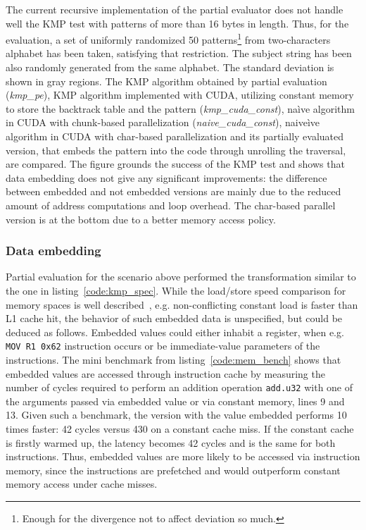 The current recursive implementation of the partial evaluator does not
handle well the KMP test with patterns of more than 16 bytes in length.
Thus, for the evaluation, a set of uniformly randomized 50 patterns\footnote{Enough for the divergence not to affect deviation so much.}
from two-characters alphabet has been taken, satisfying that restriction. The subject string has been also randomly generated from the same alphabet. The standard deviation is shown in gray regions.
The KMP algorithm obtained by partial evaluation (\emph{kmp\_pe}), KMP algorithm implemented with CUDA, utilizing constant memory to store the backtrack table and the pattern (\emph{kmp\_cuda\_const}),
na\`ive algorithm in CUDA with chunk-based parallelization (\emph{naive\_cuda\_const}), naive\`ive algorithm in CUDA with char-based parallelization and its partially evaluated version, that embeds the
pattern into the code through unrolling the traversal, are compared. The figure grounds the success of the KMP test and shows that data embedding does not give any significant improvements: the difference
between embedded and not embedded versions are mainly due to the reduced amount of address computations and loop overhead. The char-based parallel version is at the bottom due to a better memory access policy.

\subsubsection{Data embedding}\label{data_embedding}
Partial evaluation for the scenario above performed the transformation
similar to the one in listing~\ref{code:kmp_spec}. While the load/store
speed comparison for memory spaces is well described~\cite{TeslaT4Bench},
e.g. non-conflicting constant load is faster than L1 cache hit, the behavior
of such embedded data is unspecified, but could be deduced as follows.
Embedded values could either inhabit a register, when e.g. \texttt{MOV R1 0x62}
 instruction occurs or be immediate-value parameters of the instructions.
  The mini benchmark from listing~\ref{code:mem_bench} shows that embedded values are accessed through instruction cache by measuring the
   number of cycles required to perform an addition operation
   \texttt{add.u32} with one of the arguments passed via embedded value or
   via constant memory, lines 9 and 13. Given such a benchmark, the version with the value
   embedded performs 10 times faster: 42 cycles versus 430 on a constant cache miss. If the constant
   cache is firstly warmed up, the latency becomes 42 cycles and is the same for both instructions.
   Thus, embedded values are more likely to be accessed via instruction memory, since
   the instructions are prefetched and would outperform constant memory access under cache misses.

